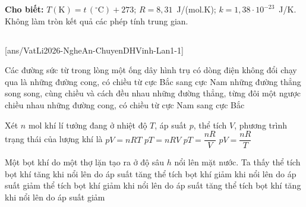 
	\noindent\textbf{Cho biết:} $T(\text{K})=t\,(^\circ\text{C})+273$; $R=8{,}31$~J/(mol.K); $k=1{,}38\cdot 10^{-23}$~J/K.\\
	Không làm tròn kết quả các phép tính trung gian.

	\noindent
	\subsection*{}
	\setcounter{ex}{0}
	[ans/VatLi2026-NgheAn-ChuyenDHVinh-Lan1-1]

	\begin{ex}%
		Các đường sức từ trong lòng một ống dây hình trụ có dòng điện không đổi chạy qua là
		\choice
		{những đường cong, có chiều từ cực Bắc sang cực Nam}
		{\True những đường thẳng song song, cùng chiều và cách đều nhau}
		{những đường thẳng, từng đôi một ngược chiều nhau}
		{những đường cong, có chiều từ cực Nam sang cực Bắc}
	\end{ex}

	\begin{ex}%
		Xét $n$ mol khí lí tưởng đang ở nhiệt độ $T$, áp suất $p$, thể tích $V$, phương trình trạng thái của lượng khí là
		\choice
		{\True $pV=nRT$}
		{$pT=nRV$}
		{$pT=\dfrac{nR}{V}$}
		{$pV=\dfrac{nR}{T}$}
	\end{ex}

	\begin{ex}%
		Một bọt khí do một thợ lặn tạo ra ở độ sâu $h$ nổi lên mặt nước. Ta thấy
		\choice
		{thể tích bọt khí tăng khi nổi lên do áp suất tăng}
		{thể tích bọt khí giảm khi nổi lên do áp suất giảm}
		{thể tích bọt khí giảm khi nổi lên do áp suất tăng}
		{\True thể tích bọt khí tăng khi nổi lên do áp suất giảm}
	\end{ex}


